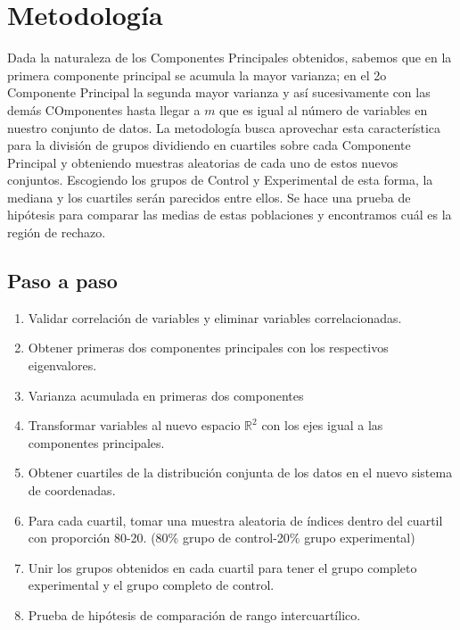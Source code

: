 \chapter{Metodología}

\noindent Dada la naturaleza de los Componentes Principales obtenidos, sabemos que en la primera componente principal se acumula la mayor varianza; en el 2o Componente Principal la segunda mayor varianza y así sucesivamente con las demás COmponentes hasta llegar a $m$ que es igual al número de variables en nuestro conjunto de datos. La metodología busca aprovechar esta característica para la división de grupos dividiendo en cuartiles sobre cada Componente Principal y obteniendo muestras aleatorias de cada uno de estos nuevos conjuntos. Escogiendo los grupos de Control y Experimental de esta forma, la mediana y los cuartiles serán parecidos entre ellos.
Se hace una prueba de hipótesis para comparar las medias de estas poblaciones y encontramos cuál es la región de rechazo.
\section{Paso a paso}
\begin{enumerate}
    \item Validar correlación de variables y eliminar variables correlacionadas.
    \item Obtener primeras dos componentes principales con los respectivos eigenvalores.
    \item Varianza acumulada en primeras dos componentes
    \item Transformar variables al nuevo espacio $\mathbb{R}^2$ con los ejes igual a las componentes principales.
    \item Obtener cuartiles de la distribución conjunta de los datos en el nuevo sistema de coordenadas.
    \item Para cada cuartil, tomar una muestra aleatoria de índices dentro del cuartil con proporción 80-20. (80\% grupo de control-20\% grupo experimental)
    \item Unir los grupos obtenidos en cada cuartil para tener el grupo completo experimental y el grupo completo de control.
    \item Prueba de hipótesis de comparación de rango intercuartílico.
\end{enumerate}
